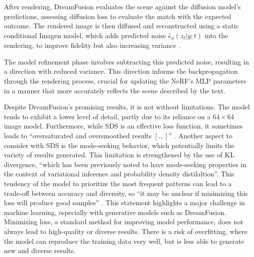After rendering, DreamFusion evaluates the scene against the diffusion model's predictions, assessing diffusion loss to evaluate the match with the expected outcome. The rendered image is then diffused and reconstructed using a static conditional Imagen model, which adds predicted noise \( \hat{\epsilon}_\phi(z_t | y; t) \) into the rendering, to improve fidelity but also increasing variance \citep{pooleDreamfusion}.

The model refinement phase involves subtracting this predicted noise, resulting in a direction with reduced variance. This direction informs the backpropagation through the rendering process, crucial for updating the NeRF's MLP parameters in a manner that more accurately reflects the scene described by the text.

Despite DreamFusion's promising results, it is not without limitations. The model tends to exhibit a lower level of detail, partly due to its reliance on a \( 64 \times 64 \) image model. Furthermore, while SDS is an effective loss function, it sometimes leads to ``oversaturated and oversmoothed results \([\ldots]\)'' \citep{pooleDreamfusion}. Another aspect to consider with SDS is the mode-seeking behavior, which potentially limits the variety of results generated. This limitation is strengthened by the use of KL divergence, ``which has been previously noted to have mode-seeking properties in the context of variational inference and probability density distilaltion''\citep{pooleDreamfusion}. This tendency of the model to prioritize the most frequent patterns can lead to a trade-off between accuracy and diversity, so ``it may be unclear if minimizing this loss will produce good samples'' \citep{pooleDreamfusion}. This statement highlights a major challenge in machine learning, especially with generative models such as DreamFusion. Minimizing loss, a standard method for improving model performance, does not always lead to high-quality or diverse results. There is a risk of overfitting, where the model can reproduce the training data very well, but is less able to generate new and diverse results.